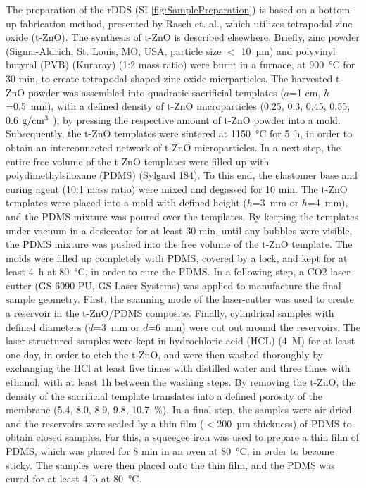 The preparation of the rDDS (SI \cref{fig:SamplePreparation}) is based on a bottom-up fabrication method, presented by Rasch et. al.\supercite{rasch2020macroscopic}, which utilizes tetrapodal zinc oxide (t-ZnO). The synthesis of t-ZnO is described elsewhere\supercite{mishra2013fabrication,mishra2015direct}. Briefly, zinc powder (Sigma-Aldrich, St. Louis, MO, USA, particle size $<$ 10~µm) and polyvinyl butyral (PVB) (Kuraray) (1:2 mass ratio) were burnt in a furnace, at 900~°C for 30 min, to create tetrapodal-shaped zinc oxide micrparticles. The harvested t-ZnO powder was assembled into quadratic sacrificial templates ($a$=1 cm, $h$=0.5~mm), with a defined density of t-ZnO microparticles (0.25, 0.3, 0.45, 0.55, 0.6 ${\rm g/cm^3}$ ), by pressing the respective amount of t-ZnO powder into a mold. Subsequently, the t-ZnO templates were sintered at 1150~°C for 5~h, in order to obtain an interconnected network of t-ZnO microparticles. In a next step, the entire free volume of the t-ZnO templates were filled up with polydimethylsiloxane (PDMS) (Sylgard 184). To this end, the elastomer base and curing agent (10:1 mass ratio) were mixed and degassed for 10 min. The t-ZnO templates were placed into a mold with defined height ($h$=3~mm or $h$=4~mm), and the PDMS mixture was poured over the templates. By keeping the templates under vacuum in a desiccator for at least 30 min, until any bubbles were visible, the PDMS mixture was pushed into the free volume of the t-ZnO template. The molds were filled up completely with PDMS, covered by a lock, and kept for at least 4~h at 80~°C, in order to cure the PDMS. In a following step, a CO2 laser-cutter (GS 6090 PU, GS Laser Systems) was applied to manufacture the final sample geometry. First, the scanning mode of the laser-cutter was used to create a reservoir in the t-ZnO/PDMS composite. Finally, cylindrical samples with defined diameters ($d$=3~mm or $d$=6~mm) were cut out around the reservoirs. The laser-structured samples were kept in hydrochloric acid (HCL) (4~M) for at least one day, in order to etch the t-ZnO, and were then washed thoroughly by exchanging the HCl at least five times with distilled water and three times with ethanol, with at least 1h between the washing steps. By removing the t-ZnO, the density of the sacrificial template translates into a defined porosity of the membrane (5.4, 8.0, 8.9, 9.8, 10.7~\%). In a final step, the samples were air-dried, and the reservoirs were sealed by a thin film ($<$200~µm thickness) of PDMS to obtain closed samples. For this, a squeegee iron was used to prepare a thin film of PDMS, which was placed for 8 min in an oven at 80~°C, in order to become sticky. The samples were then placed onto the thin film, and the PDMS was cured for at least 4~h at 80~°C.

